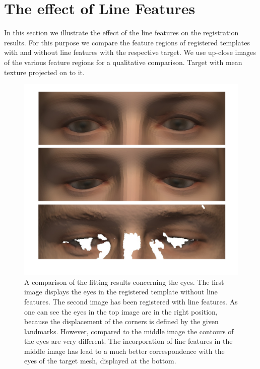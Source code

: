 \section{The effect of Line Features}
In this section we illustrate the effect of the line features on the registration results.
For this purpose we compare the feature regions of registered templates with and without line features with the respective target. We use up-close images of the various feature regions for a qualitative comparison.
Target with mean texture projected on to it.
\begin{figure}[h!]
    \centering
    \includegraphics[width=.9\textwidth]{./resources/img/00029_eyes_comparison.pdf}
\caption{A comparison of the fitting results concerning the eyes. The first image displays the eyes in the registered template without line features. The second image has been registered with line features. As one can see the eyes in the top image are in the right position, because the displacement of the corners is defined by the given landmarks. However, compared to the middle image the contours of the eyes are very different. The incorporation of line features in the middle
image has lead to a much better correspondence with the eyes of the target mesh, displayed at the bottom.}
\label{fig:fiteyes}
\end{figure}

